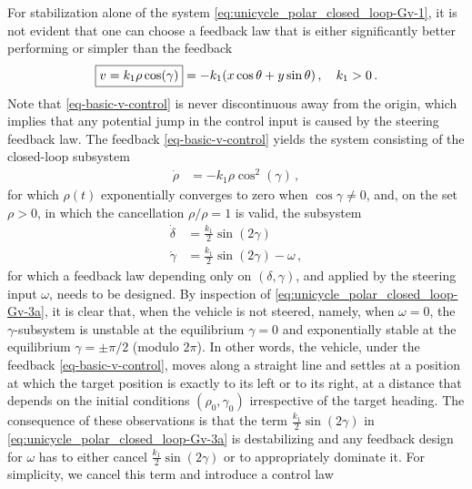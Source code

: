 \documentclass[journal,twoside,web]{ieeecolor}
\theoremstyle{definition}
\begin{document}
For stabilization alone of the system \eqref{eq:unicycle_polar_closed_loop-Gv-1}, it is not evident that one can choose a feedback law that is either significantly better performing or simpler than the feedback
\begin{equation}
\label{eq-basic-v-control}
\fbox{$v =  k_1 \rho \cos(\gamma)$} = -k_1(x\cos\theta+y\sin\theta)\,,  \quad k_1>0\,.
\end{equation}
Note that \eqref{eq-basic-v-control} is never discontinuous away from the origin, which implies that any potential jump in the control input is caused by the steering feedback law.
The feedback \eqref{eq-basic-v-control} yields the system consisting of the closed-loop subsystem 
\begin{align}
\label{eq:unicycle_polar_closed_loop-Gv-2}
\dot{\rho} &=  
- k_1 \rho \cos^2(\gamma)\,,
\end{align} 
for which $\rho(t)$ exponentially converges to zero when $\cos \gamma\neq 0$, 
and, on the set $\rho>0$, in which the cancellation $\rho/\rho=1$ is valid, the subsystem 
\begin{subequations}
\label{eq:unicycle_polar_closed_loop-Gv-3}
\begin{align}
\dot{\delta} &=  \frac{k_1}{2} \sin(2\gamma) \label{eq:unicycle_polar_closed_loop-Gv-3n}\\
\dot{\gamma} &= \frac{k_1}{2} \sin(2\gamma) -\omega \label{eq:unicycle_polar_closed_loop-Gv-3a} \,,
\end{align} 
\end{subequations}
for which a feedback law depending only on $(\delta,\gamma)$, and applied by the steering input $\omega$, needs to be designed. 
By inspection of \eqref{eq:unicycle_polar_closed_loop-Gv-3a}, it is clear that, when the vehicle is not steered, namely, when $\omega=0$, the $\gamma$-subsystem is unstable at the equilibrium $\gamma=0$ and exponentially stable at the equilibrium $\gamma = \pm\pi/2$ (modulo $2\pi$). In other words, the vehicle, under the feedback \eqref{eq-basic-v-control}, moves along a straight line and settles at a position at which the target position is exactly to its left or to its right, at a distance that depends on the initial conditions $(\rho_0,\gamma_0)$ irrespective of the target heading. The consequence of these observations is that the term $\frac{k_1}{2} \sin(2\gamma)$ in \eqref{eq:unicycle_polar_closed_loop-Gv-3a} is destabilizing and any feedback design for $\omega$ has to either cancel $\frac{k_1}{2} \sin(2\gamma)$ or to appropriately dominate it. For simplicity, we cancel this term and introduce a control law
\end{document}
